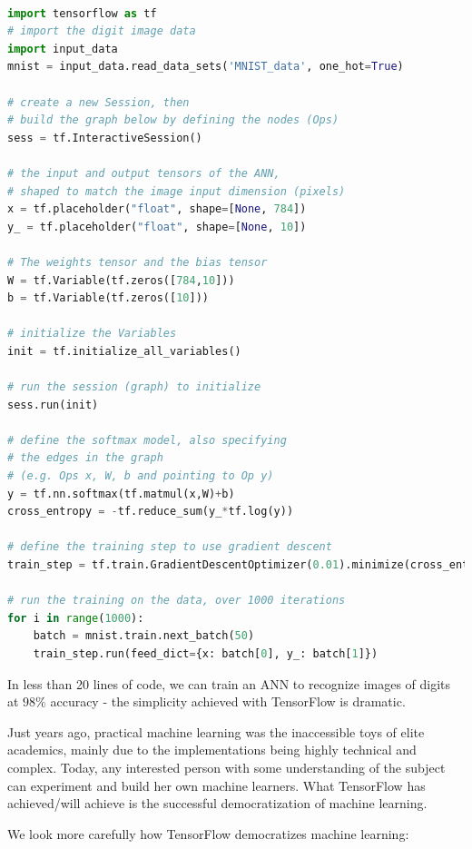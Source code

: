 \documentclass[12pt]{article}  %
\begin{document}
\begin{lstlisting}[language=Python]

import tensorflow as tf
# import the digit image data
import input_data
mnist = input_data.read_data_sets('MNIST_data', one_hot=True)

# create a new Session, then 
# build the graph below by defining the nodes (Ops)
sess = tf.InteractiveSession()

# the input and output tensors of the ANN, 
# shaped to match the image input dimension (pixels)
x = tf.placeholder("float", shape=[None, 784])
y_ = tf.placeholder("float", shape=[None, 10])

# The weights tensor and the bias tensor
W = tf.Variable(tf.zeros([784,10]))
b = tf.Variable(tf.zeros([10]))

# initialize the Variables
init = tf.initialize_all_variables()

# run the session (graph) to initialize
sess.run(init)

# define the softmax model, also specifying 
# the edges in the graph 
# (e.g. Ops x, W, b and pointing to Op y)
y = tf.nn.softmax(tf.matmul(x,W)+b)
cross_entropy = -tf.reduce_sum(y_*tf.log(y))

# define the training step to use gradient descent
train_step = tf.train.GradientDescentOptimizer(0.01).minimize(cross_entropy)

# run the training on the data, over 1000 iterations
for i in range(1000):
	batch = mnist.train.next_batch(50)
	train_step.run(feed_dict={x: batch[0], y_: batch[1]})
\end{lstlisting}


In less than 20 lines of code, we can train an ANN to recognize images of digits at $98\%$ accuracy - the simplicity achieved with TensorFlow is dramatic. 

Just years ago, practical machine learning was the inaccessible toys of elite academics, mainly due to the implementations being highly technical and complex. Today, any interested person with some understanding of the subject can experiment and build her own machine learners. What TensorFlow has achieved/will achieve is the successful democratization of machine learning.

We look more carefully how TensorFlow democratizes machine learning:
\end{document}
